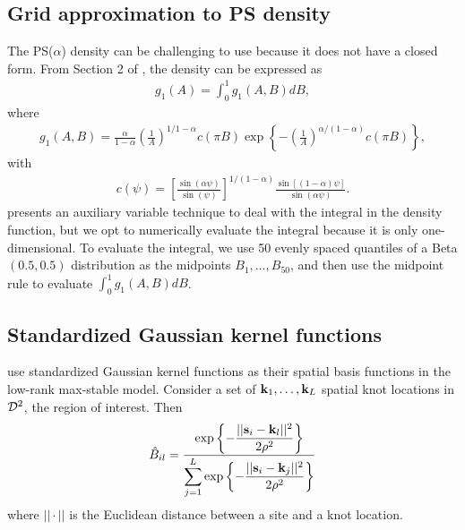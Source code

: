 \documentclass[11pt]{article}
\begin{document}
\subsection{Grid approximation to PS density} \label{eba:gridapprox}
The PS($\alpha$) density can be challenging to use because it does not have a closed form.
From Section 2 of \citep{Stephenson2009}, the density can be expressed as
\begin{align}
  g_1(A) = \int_0^1 g_1(A, B) dB,
\end{align}
where
\begin{align}
  g_1(A, B) = \frac{\alpha}{1 - \alpha} \left( \frac{1}{A} \right)^{1 / 1 - \alpha} c(\pi B) \exp \left\{ -\left(\frac{1}{A}\right)^{\alpha / (1 - \alpha)} c(\pi B) \right\},
\end{align}
with
\begin{align}
  c(\psi) = \left[\frac{\sin(\alpha \psi)}{\sin(\psi)}\right]^{1 / (1 - \alpha)} \frac{\sin[(1 - \alpha) \psi]}{\sin(\alpha \psi)}.
\end{align}
 presents an auxiliary variable technique to deal with the integral in the density function, but we opt to numerically evaluate the integral because it is only one-dimensional.
To evaluate the integral, we use 50 evenly spaced quantiles of a Beta$(0.5, 0.5)$ distribution as the midpoints $B_1, \ldots, B_{50}$, and then use the midpoint rule to evaluate $\displaystyle \int_0^1 g_1(A, B) dB$.

\subsection{Standardized Gaussian kernel functions} \label{eba:gskfunctions}
\citet{Reich2012} use standardized Gaussian kernel functions as their spatial basis functions in the low-rank max-stable model.
Consider a set of $\mbox{\bf k}_1, \ldots, \mbox{\bf k}_L$ spatial knot locations in ${\cal D}^2$, the region of interest.
Then
\begin{align}
  \hat{B}_{il} = \frac{\exp\left\{- \displaystyle\frac{||\mbox{\bf s}_i - \mbox{\bf k}_l||^2}{2 \rho^2} \right\}}{\displaystyle \sum_{j = 1}^L \exp\left\{- \frac{||\mbox{\bf s}_i - \mbox{\bf k}_j||^2}{2 \rho^2} \right\}}
\end{align}
where $|| \cdot ||$ is the Euclidean distance between a site and a knot location.
\end{document}
